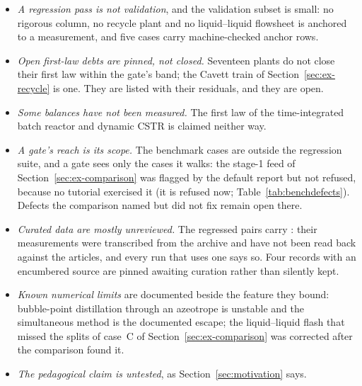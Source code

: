 \documentclass[11pt,a4paper]{article}
\newcommand{\code}[1]{\texttt{\detokenize{#1}}}
\begin{document}
\begin{itemize}
\item \emph{A regression pass is not validation}, and the validation subset
  is small: no rigorous column, no recycle plant and no liquid--liquid
  flowsheet is anchored to a measurement, and five cases carry
  machine-checked anchor rows.
\item \emph{Open first-law debts are pinned, not closed.}  Seventeen plants
  do not close their first law within the gate's band; the Cavett train of
  Section~\ref{sec:ex-recycle} is one.  They are listed with their
  residuals, and they are open.
\item \emph{Some balances have not been measured.}  The first law of the
  time-integrated batch reactor and dynamic CSTR is claimed neither way.
\item \emph{A gate's reach is its scope.}  The benchmark cases are outside
  the regression suite, and a gate sees only the cases it walks: the
  stage-1 feed of Section~\ref{sec:ex-comparison} was flagged by the
  default report but not refused, because no tutorial exercised it (it is
  refused now; Table~\ref{tab:benchdefects}).  Defects the comparison
  named but did not fix remain open there.
\item \emph{Curated data are mostly unreviewed.}  The regressed pairs carry
  \code{reviewStatus interim}: their measurements were transcribed from the
  archive and have not been read back against the articles, and every run
  that uses one says so.  Four records with an encumbered source are pinned
  awaiting curation rather than silently kept.
\item \emph{Known numerical limits} are documented beside the feature they
  bound: bubble-point distillation through an azeotrope is unstable and the
  simultaneous method is the documented escape; the liquid--liquid flash
  that missed the splits of case~C of Section~\ref{sec:ex-comparison} was
  corrected after the comparison found it.
\item \emph{The pedagogical claim is untested}, as Section~\ref{sec:motivation}
  says.
\end{itemize}
\end{document}
